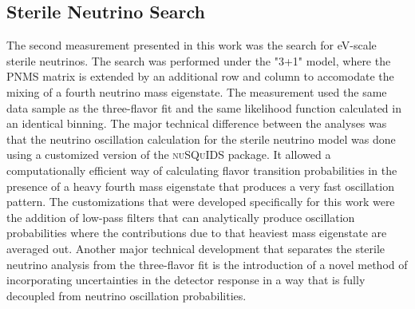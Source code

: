 \subsection{Sterile Neutrino Search}
\label{sec:summary-sterile-osc}

The second measurement presented in this work was the search for eV-scale sterile neutrinos. The search was performed under the "3+1" model, where the PNMS matrix is extended by an additional row and column to accomodate the mixing of a fourth neutrino mass eigenstate. The measurement used the same data sample as the three-flavor fit and the same likelihood function calculated in an identical binning. The major technical difference between the analyses was that the neutrino oscillation calculation for the sterile neutrino model was done using a customized version of the \textsc{nuSQuIDS} package. It allowed a computationally efficient way of calculating flavor transition probabilities in the presence of a heavy fourth mass eigenstate that produces a very fast oscillation pattern. The customizations that were developed specifically for this work were the addition of low-pass filters that can analytically produce oscillation probabilities where the contributions due to that heaviest mass eigenstate are averaged out. Another major technical development that separates the sterile neutrino analysis from the three-flavor fit is the introduction of a novel method of incorporating uncertainties in the detector response in a way that is fully decoupled from neutrino oscillation probabilities.


